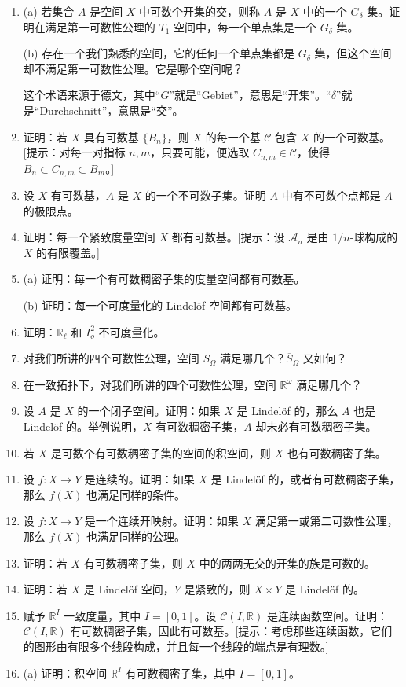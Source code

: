 \begin{enumerate}
\item (a) 若集合 $A$ 是空间 $X$ 中可数个开集的交，则称 $A$ 是 $X$ 中的一个 $G_{\delta}$ 集。证明在满足第一可数性公理的 $T_{1}$ 空间中，每一个单点集是一个 $G_{\delta}$ 集。

(b) 存在一个我们熟悉的空间，它的任何一个单点集都是 $G_{\delta}$ 集，但这个空间却不满足第一可数性公理。它是哪个空间呢？

这个术语来源于德文，其中``$G$''就是``Gebiet''，意思是``开集''。``$\delta$''就是``Durchschnitt''，意思是``交''。
\item 证明：若 $X$ 具有可数基 $\{B_{n}\}$，则 $X$ 的每一个基 $\mathcal{C}$ 包含 $X$ 的一个可数基。[提示：对每一对指标 $n,m$，只要可能，便选取 $C_{n,m}\in\mathcal{C}$，使得 $B_{n}\subset C_{n,m}\subset B_{m}$。]
\item 设 $X$ 有可数基，$A$ 是 $X$ 的一个不可数子集。证明 $A$ 中有不可数个点都是 $A$ 的极限点。
\item 证明：每一个紧致度量空间 $X$ 都有可数基。[提示：设 $\mathcal{A}_{n}$ 是由 $1/n$-球构成的 $X$ 的有限覆盖。]
\item (a) 证明：每一个有可数稠密子集的度量空间都有可数基。

(b) 证明：每一个可度量化的 Lindelöf 空间都有可数基。
\item 证明：$\mathbb{R}_{\ell}$ 和 $I_{o}^{2}$ 不可度量化。
\item 对我们所讲的四个可数性公理，空间 $S_{\Omega}$ 满足哪几个？$\overline{S}_{\Omega}$ 又如何？
\item 在一致拓扑下，对我们所讲的四个可数性公理，空间 $\mathbb{R}^{\omega}$ 满足哪几个？
\item 设 $A$ 是 $X$ 的一个闭子空间。证明：如果 $X$ 是 Lindelöf 的，那么 $A$ 也是 Lindelöf 的。举例说明，$X$ 有可数稠密子集，$A$ 却未必有可数稠密子集。
\item 若 $X$ 是可数个有可数稠密子集的空间的积空间，则 $X$ 也有可数稠密子集。
\item 设 $f\colon X\to Y$ 是连续的。证明：如果 $X$ 是 Lindelöf 的，或者有可数稠密子集，那么 $f(X)$ 也满足同样的条件。
\item 设 $f\colon X\to Y$ 是一个连续开映射。证明：如果 $X$ 满足第一或第二可数性公理，那么 $f(X)$ 也满足同样的公理。
\item 证明：若 $X$ 有可数稠密子集，则 $X$ 中的两两无交的开集的族是可数的。
\item 证明：若 $X$ 是 Lindelöf 空间，$Y$ 是紧致的，则 $X\times Y$ 是 Lindelöf 的。
\item 赋予 $\mathbb{R}^{I}$ 一致度量，其中 $I=[0,1]$。设 $\mathcal{C}(I,\mathbb{R})$ 是连续函数空间。证明：$\mathcal{C}(I,\mathbb{R})$ 有可数稠密子集，因此有可数基。[提示：考虑那些连续函数，它们的图形由有限多个线段构成，并且每一个线段的端点是有理数。]
\item (a) 证明：积空间 $\mathbb{R}^{I}$ 有可数稠密子集，其中 $I=[0,1]$。


\end{enumerate}
